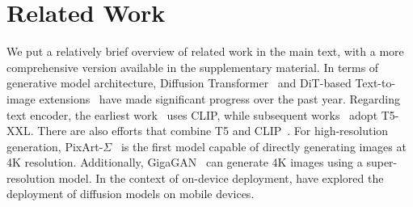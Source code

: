 \section{Related Work}

We put a relatively brief overview of related work in the main text, with a more comprehensive version available in the supplementary material. In terms of generative model architecture, Diffusion Transformer~\citep{Peebles2022DiT} and DiT-based Text-to-image extensions~\citep{chenpixart,esser2024scaling,FLUX} have made significant progress over the past year. 
Regarding text encoder, the earliest work~\citep{rombach2022high} uses CLIP, while subsequent works~\citep{saharia2022photorealistic,chenpixart,chen2024pixart} adopt T5-XXL. There are also efforts that combine T5 and CLIP~\citep{balaji2022ediff,esser2024scaling}.
For high-resolution generation, PixArt-$\Sigma$~\citep{chen2024pixart} is the first model capable of directly generating images at 4K resolution. Additionally, GigaGAN~\citep{kang2023scaling} can generate 4K images using a super-resolution model. 
In the context of on-device deployment, \cite{zhao2023mobilediffusion,li2024snapfusion} have explored the deployment of diffusion models on mobile devices.